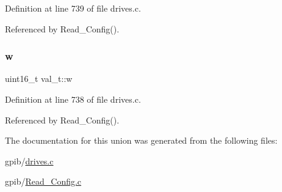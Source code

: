 Definition at line 739 of file drives.\+c.



Referenced by Read\+\_\+\+Config().

\mbox{\label{unionval__t_a35ceb0f111824a2835370671131c38c0}} 
\subsubsection{\texorpdfstring{w}{w}}
{\footnotesize\ttfamily uint16\+\_\+t val\+\_\+t\+::w}



Definition at line 738 of file drives.\+c.



Referenced by Read\+\_\+\+Config().



The documentation for this union was generated from the following files\+:\begin{DoxyCompactItemize}
\item 
gpib/\hyperlink{drives_8c}{drives.\+c}\item 
gpib/\hyperlink{Read__Config_8c}{Read\+\_\+\+Config.\+c}\end{DoxyCompactItemize}
